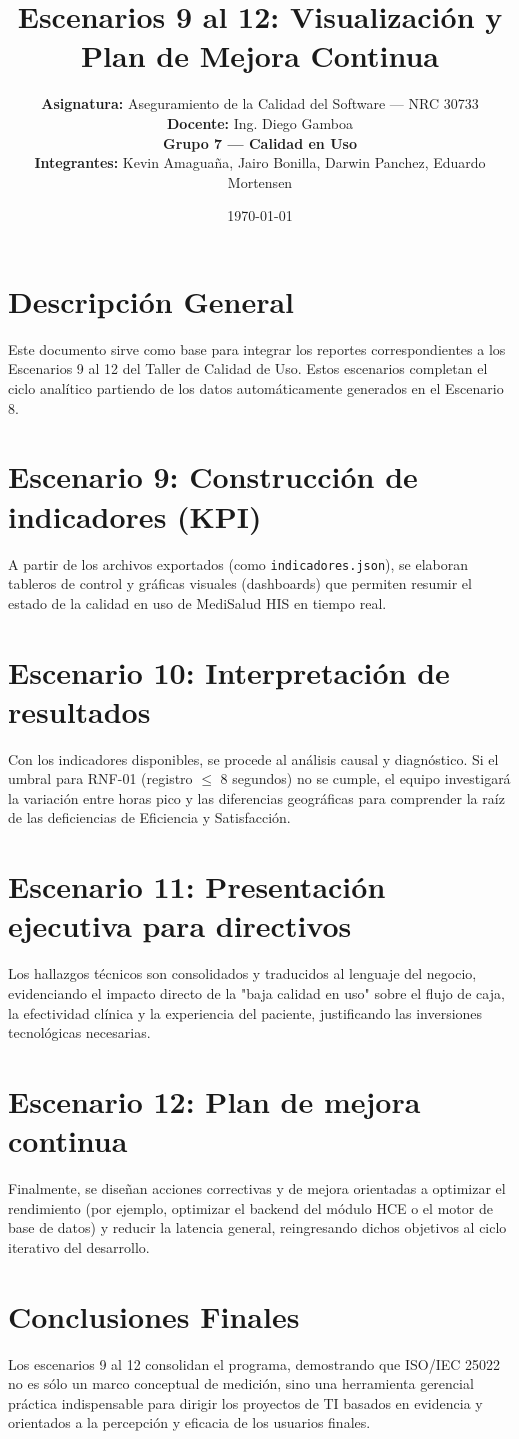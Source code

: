 ﻿\documentclass[12pt,a4paper]{article}
\title{\textbf{Escenarios 9 al 12: Visualizaci\'on y Plan de Mejora Continua}}
\author{
\textbf{Asignatura:} Aseguramiento de la Calidad del Software --- NRC 30733 \\
\textbf{Docente:} Ing. Diego Gamboa \\
\textbf{Grupo 7 --- Calidad en Uso} \\
\textbf{Integrantes:} Kevin Amagua\~na, Jairo Bonilla, Darwin Panchez, Eduardo Mortensen
}
\date{\today}
\begin{document}
\maketitle

\section{Descripci\'on General}
Este documento sirve como base para integrar los reportes correspondientes a los Escenarios 9 al 12 del Taller de Calidad de Uso. Estos escenarios completan el ciclo anal\'itico partiendo de los datos autom\'aticamente generados en el Escenario 8.

\section{Escenario 9: Construcci\'on de indicadores (KPI)}
A partir de los archivos exportados (como \texttt{indicadores.json}), se elaboran tableros de control y gr\'aficas visuales (dashboards) que permiten resumir el estado de la calidad en uso de MediSalud HIS en tiempo real.

\section{Escenario 10: Interpretaci\'on de resultados}
Con los indicadores disponibles, se procede al an\'alisis causal y diagn\'ostico. Si el umbral para RNF-01 (registro $\le$ 8 segundos) no se cumple, el equipo investigar\'a la variaci\'on entre horas pico y las diferencias geogr\'aficas para comprender la ra\'iz de las deficiencias de Eficiencia y Satisfacci\'on.

\section{Escenario 11: Presentaci\'on ejecutiva para directivos}
Los hallazgos t\'ecnicos son consolidados y traducidos al lenguaje del negocio, evidenciando el impacto directo de la "baja calidad en uso" sobre el flujo de caja, la efectividad cl\'inica y la experiencia del paciente, justificando las inversiones tecnol\'ogicas necesarias.

\section{Escenario 12: Plan de mejora continua}
Finalmente, se dise\~nan acciones correctivas y de mejora orientadas a optimizar el rendimiento (por ejemplo, optimizar el backend del m\'odulo HCE o el motor de base de datos) y reducir la latencia general, reingresando dichos objetivos al ciclo iterativo del desarrollo.

\section{Conclusiones Finales}
Los escenarios 9 al 12 consolidan el programa, demostrando que ISO/IEC 25022 no es s\'olo un marco conceptual de medici\'on, sino una herramienta gerencial pr\'actica indispensable para dirigir los proyectos de TI basados en evidencia y orientados a la percepci\'on y eficacia de los usuarios finales.
\end{document}
